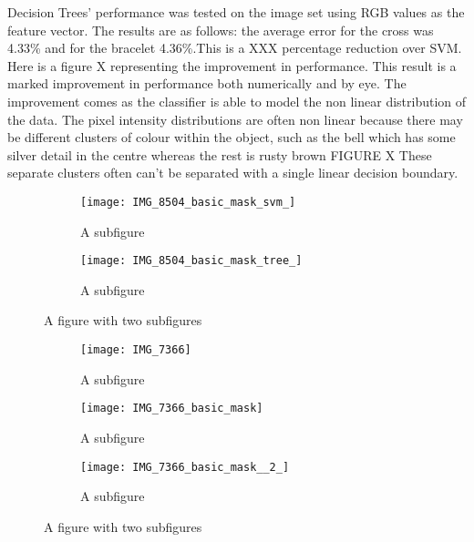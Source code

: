 \documentclass[12pt]{IIBproject}
\begin{document}
 Decision Trees' performance was tested on the image set using RGB values as the feature vector. The results are as follows: the average error for the cross was 4.33\% and for the bracelet 4.36\%.This is a XXX percentage reduction over SVM. Here is a figure X representing the improvement in performance. This result is a marked improvement in performance both numerically and by eye. The improvement comes as the classifier is able to model the non linear distribution of the data. The pixel intensity distributions are often non linear because there may be different clusters of colour within the object, such as the bell which has some silver detail in the centre whereas the rest is rusty brown FIGURE X These separate clusters often can't be separated with a single linear decision boundary.
\begin{figure}[H]
\centering
\begin{subfigure}{.5\textwidth}
  \centering
  \texttt{[image: IMG\_8504\_basic\_mask\_svm\_]}
  \caption{A subfigure}
  \label{fig:sub1}
\end{subfigure}%
\begin{subfigure}{.5\textwidth}
  \centering
  \texttt{[image: IMG\_8504\_basic\_mask\_tree\_]}
  \caption{A subfigure}
  \label{fig:sub2}
\end{subfigure}
\caption{A figure with two subfigures}
\label{fig:test}
\end{figure}
\begin{figure}[H]
\centering
\begin{subfigure}{.33\textwidth}
  \centering
  \texttt{[image: IMG\_7366]}
  \caption{A subfigure}
  \label{fig:sub1}
\end{subfigure}%
\begin{subfigure}{.33\textwidth}
  \centering
  \texttt{[image: IMG\_7366\_basic\_mask]}
  \caption{A subfigure}
  \label{fig:sub2}
\end{subfigure}
\begin{subfigure}{.33\textwidth}
  \centering
  \texttt{[image: IMG\_7366\_basic\_mask\_\_2\_]}
  \caption{A subfigure}
  \label{fig:sub2}
\end{subfigure}
\caption{A figure with two subfigures}
\label{fig:test}
\end{figure}
\end{document}
